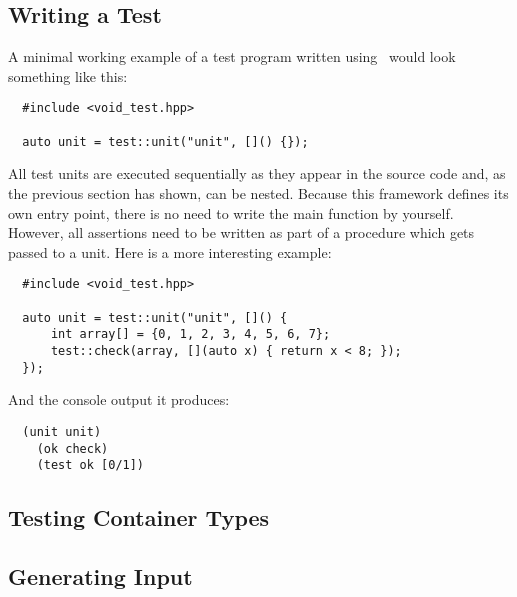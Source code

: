 \subsection{Writing a Test}
A minimal working example of a test program written using \voidtest\ would look
something like this:
\begin{verbatim}
  #include <void_test.hpp>

  auto unit = test::unit("unit", []() {});
\end{verbatim}
All test units are executed sequentially as they appear in the source code and,
as the previous section has shown, can be nested. Because this framework defines
its own entry point, there is no need to write the main function by yourself.
However, all assertions need to be written as part of a procedure which gets
passed to a unit. Here is a more interesting example:
\begin{verbatim}
  #include <void_test.hpp>

  auto unit = test::unit("unit", []() {
      int array[] = {0, 1, 2, 3, 4, 5, 6, 7};
      test::check(array, [](auto x) { return x < 8; });
  });
\end{verbatim}
And the console output it produces:
\begin{verbatim}
  (unit unit)
    (ok check)
    (test ok [0/1])
\end{verbatim}

\subsection{Testing Container Types}
\subsection{Generating Input}
